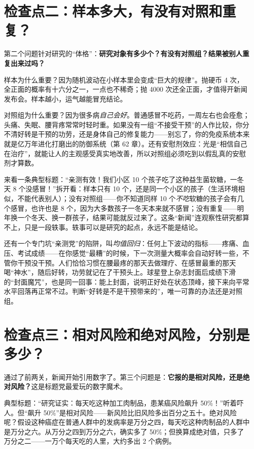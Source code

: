 \section{检查点二：样本多大，有没有对照和重复？}

第二个问题针对研究的“体格”：\textbf{研究对象有多少个？有没有对照组？结果被别人重复出来过吗？}

样本为什么重要？因为随机波动在小样本里会变成“巨大的规律”。抛硬币 4 次，全正面的概率有十六分之一，一点也不稀奇；抛 4000 次还全正面，才值得开新闻发布会。样本越小，运气越能冒充结论。

对照组为什么重要？因为很多病\emph{自己会好}。普通感冒不吃药，一周左右也会痊愈；头痛、失眠、腰背疼常常时轻时重。如果没有一组“不接受干预”的人作比较，你分不清好转是干预的功劳，还是身体自己的修复能力——别忘了，你的免疫系统本来就是亿万年进化打磨出的防御系统（第 62 章）。还有安慰剂效应：光是“相信自己在治疗”，就能让人的主观感受真实地改善，所以对照组必须吃到以假乱真的安慰剂才算数。

来看一条典型标题：“亲测有效！我们小区 10 个孩子吃了这种益生菌软糖，一冬天 8 个没感冒！”拆开看：样本只有 10 个，还是同一个小区的孩子（生活环境相似，不能代表别人）；没有对照组——你不知道同样 10 个\emph{不吃}软糖的孩子会有几个感冒，也许也是 8 个，因为大多数孩子一冬天本来就不感冒；没有重复——明年换一个冬天、换一群孩子，结果可能就反过来了。这条“新闻”连观察性研究都算不上，只是一段轶事。轶事可以是研究的起点，永远不能是结论。

还有一个专门坑“亲测党”的陷阱，叫\emph{均值回归}：任何上下波动的指标——疼痛、血压、考试成绩——在你感觉“最糟”的时候，下一次测量大概率会自动好转一些，不管你干预没干预。人们恰恰习惯在腰最疼的那天去做理疗、在感冒最重的那天喝“神水”，随后好转，功劳就记在了干预头上。球星登上杂志封面后成绩下滑的“封面魔咒”，也是同一回事：能上封面，说明正好处在状态顶峰，接下来向平常水平回落再正常不过。判断“好转是不是干预带来的”，唯一可靠的办法还是对照组。

\section{检查点三：相对风险和绝对风险，分别是多少？}

通过了前两关，新闻开始引用数字了。第三个问题是：\textbf{它报的是相对风险，还是绝对风险？}这是标题党最爱玩的数字魔术。

典型标题：“研究证实：每天吃这种加工肉制品，患某癌风险飙升 50\%！”听着吓人。但“飙升 50\%”是相对风险——新风险比旧风险多出百分之五十。绝对风险呢？假设这种癌症在普通人群中的发病率是万分之四，每天吃这种肉制品的人群中是万分之六。从万分之四到万分之六，确实多了 50\%；但换算成绝对值，只多了万分之二——一万个每天吃的人里，大约多出 2 个病例。


